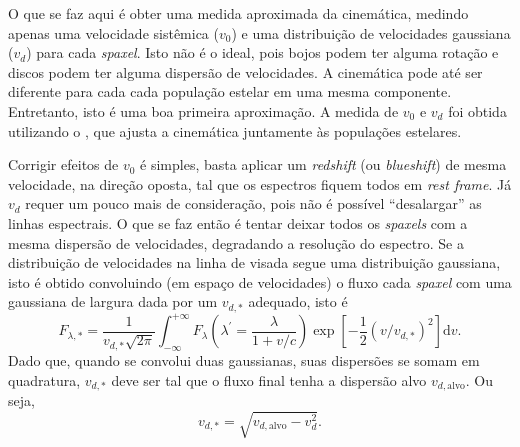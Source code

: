 O que se faz aqui é obter uma medida aproximada da cinemática, medindo apenas
uma velocidade sistêmica ($v_0$) e uma distribuição de velocidades gaussiana
($v_d$) para cada {\em spaxel}. Isto não é o ideal, pois bojos podem ter alguma
rotação e discos podem ter alguma dispersão de velocidades. A cinemática pode
até ser diferente para cada cada população estelar em uma mesma componente.
Entretanto, isto é uma boa primeira aproximação. A medida de $v_0$ e $v_d$ foi
obtida utilizando o \starlight, que ajusta a cinemática juntamente às populações
estelares.

Corrigir efeitos de $v_0$ é simples, basta aplicar um {\em redshift} (ou {\em
blueshift}) de mesma velocidade, na direção oposta, tal que os espectros fiquem
todos em {\em rest frame}. Já $v_d$ requer um pouco mais de consideração, pois
não é possível ``desalargar'' as linhas espectrais. O que se faz então é tentar
deixar todos os {\em spaxels} com a mesma dispersão de velocidades, degradando a
resolução do espectro. Se a distribuição de velocidades na linha de visada segue
uma distribuição gaussiana, isto é obtido convoluindo (em espaço de velocidades)
o fluxo cada {\em spaxel} com uma gaussiana de largura dada por um $v_{d,\ast}$
adequado, isto é
\begin{equation*}
F_{\lambda,\ast} = \frac{1}{v_{d,\ast}\sqrt{2\pi}}\int_{-\infty}^{+\infty}
F_\lambda \left(\lambda^\prime = \frac{\lambda}{1 + v/c}\right) \exp \left[ -\frac{1}{2}
(v/v_{d,\ast})^2 \right] \mathrm{d}v.
\end{equation*}
Dado que, quando se convolui duas gaussianas, suas dispersões se somam em
quadratura, $v_{d,\ast}$ deve ser tal que o fluxo final tenha a dispersão
alvo $v_{d,\mathrm{alvo}}$. Ou seja,
\begin{equation*}
v_{d,\ast} = \sqrt{v_{d,\mathrm{alvo}} - v^2_d}.
\end{equation*}

